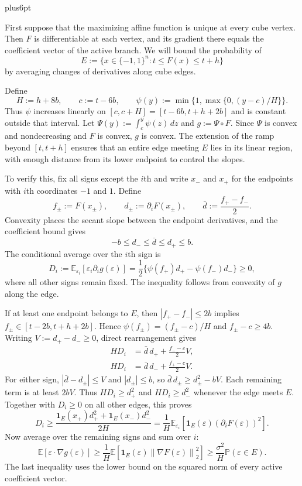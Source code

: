 \documentclass[11pt,letterpaper,twoside,leqno]{article}
\makeatletter
\theoremstyle{bookplain}
\theoremstyle{bookremark}
\renewenvironment{proof}[1][\proofname]{\par
  \pushQED{\qed}\normalfont\topsep6pt plus6pt\relax
  \trivlist\item[\hskip\labelsep\bfseries #1\@addpunct{.}]\ignorespaces
}{\popQED\endtrivlist\@endpefalse}
\newcommand{\E}{\mathbb E}
\newcommand{\Pp}{\mathbb P}
\newcommand{\norm}[1]{\left\lVert#1\right\rVert}
\newcommand{\ind}{\mathbf 1}
\makeatother
\begin{document}
\begin{proof}
First suppose that the maximizing affine function is unique at every
cube vertex. Then $F$ is differentiable at each vertex, and its
gradient there equals the coefficient vector of the active branch.
We will bound the probability of
\[
 E:=\{x\in\{-1,1\}^n:t\le F(x)\le t+h\}
\]
by averaging changes of derivatives along cube edges.

Define
\[
 H:=h+8b,\qquad c:=t-6b,\qquad
 \psi(y):=\min\{1,\max\{0,(y-c)/H\}\}.
\]
Thus $\psi$ increases linearly on
$[c,c+H]=[t-6b,t+h+2b]$ and is constant outside that interval.
Let $\Psi(y):=\int_c^y\psi(z)\,dz$ and $g:=\Psi\circ F$.
Since $\Psi$ is convex and nondecreasing and $F$ is convex,
$g$ is convex. The extension of the ramp beyond $[t,t+h]$
ensures that an entire edge meeting $E$ lies in its linear region,
with enough distance from its lower endpoint to control the slopes.

To verify this, fix all signs except the $i$th and write $x_-$
and $x_+$ for the endpoints with $i$th coordinates $-1$ and $1$.
Define
\[
 f_\pm:=F(x_\pm),\qquad
 d_\pm:=\partial_iF(x_\pm),\qquad
 \bar d:=\frac{f_+-f_-}{2}.
\]
Convexity places the secant slope between the endpoint derivatives,
and the coefficient bound gives
\[
 -b\le d_-\le\bar d\le d_+\le b.
\]
The conditional average over the $i$th sign is
\[
 D_i:=\E_{\varepsilon_i}[
       \varepsilon_i\partial_i g(\varepsilon)]
 =\frac12\{\psi(f_+)d_+-\psi(f_-)d_-\}\ge0,
\]
where all other signs remain fixed. The inequality follows from
convexity of $g$ along the edge.

If at least one endpoint belongs to $E$, then
$|f_+-f_-|\le2b$ implies
$f_\pm\in[t-2b,t+h+2b]$. Hence
$\psi(f_\pm)=(f_\pm-c)/H$ and $f_\pm-c\ge4b$.
Writing $V:=d_+-d_-\ge0$, direct rearrangement gives
\[
 \begin{aligned}
 HD_i&=\bar d\,d_++\frac{f_--c}{2}V,\\
 HD_i&=\bar d\,d_-+\frac{f_+-c}{2}V.
 \end{aligned}
\]
For either sign, $|\bar d-d_\pm|\le V$ and $|d_\pm|\le b$,
so $\bar d\,d_\pm\ge d_\pm^2-bV$. Each remaining term is
at least $2bV$. Thus $HD_i\ge d_+^2$ and $HD_i\ge d_-^2$
whenever the edge meets $E$. Together with $D_i\ge0$ on all
other edges, this proves
\[
 D_i\ge\frac{
       \ind_E(x_+)d_+^2+\ind_E(x_-)d_-^2}{2H}
 =\frac1H\E_{\varepsilon_i}
       [\ind_E(\varepsilon)(\partial_iF(\varepsilon))^2].
\]
Now average over the remaining signs and sum over $i$:
\[
 \E[\varepsilon\cdot\nabla g(\varepsilon)]
 \ge\frac1H\E[\ind_E(\varepsilon)
                       \norm{\nabla F(\varepsilon)}_2^2]
 \ge\frac{\sigma^2}{H}\Pp(\varepsilon\in E).
\]
The last inequality uses the lower bound on the squared norm of
every active coefficient vector.


\end{proof}
\end{document}
